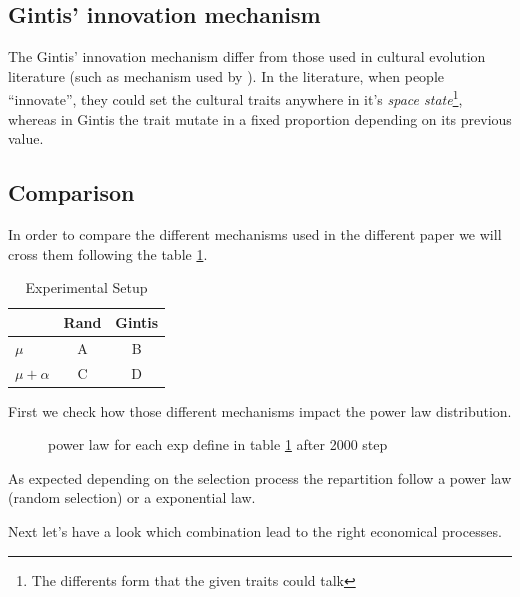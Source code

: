 \documentclass[a4paper]{article}
\begin{document}
\subsection{Gintis' innovation mechanism}

The Gintis' innovation mechanism differ from those used in cultural evolution literature (such as mechanism used by \cite{bentley2004randomdriftandculturechange,mesoudi2009randomcopyingfrequencydependencopyingandulturechange}). In the literature, when people ``innovate'', they could set the cultural traits anywhere in it's \emph{space state}\footnote{The differents form that the given traits could talk}, whereas in Gintis the trait mutate in a fixed proportion depending on its previous value.



\subsection{Comparison}
In order to compare the different mechanisms used in the different paper we will cross them  following the table \ref{tab:exp}.
\begin{table}
	\centering
	\begin{tabular}{l|c|c}
		& Rand & Gintis \\\hline
		$\mu$ &A & B \\
		$\mu +\alpha$ & C & D \\
	\end{tabular}
	\caption{Experimental Setup}
	\label{tab:exp}
\end{table}


First we check how those different mechanisms impact the power law distribution.

\begin{figure}[hbp]
	\begin{center}
	\end{center}
	\caption{power law for each exp define in table \ref{tab:exp} after 2000 step}
	\label{fig:powerABCD}
\end{figure}

As expected depending on the selection process the repartition follow a power law (random selection) or a exponential law.

Next let's have a look which combination lead to the right economical processes.
\end{document}
